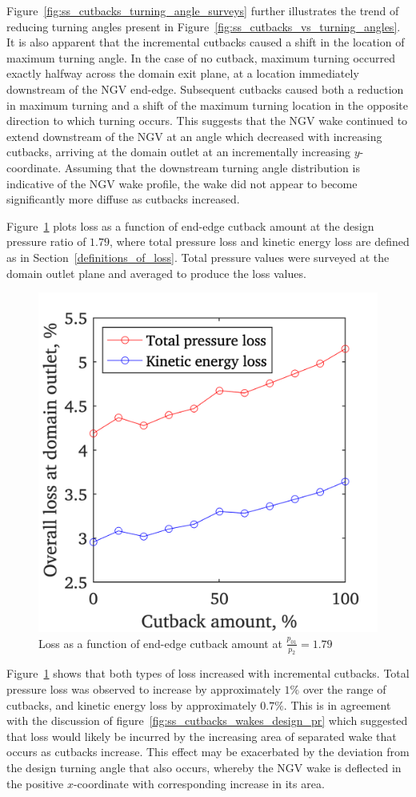 \documentclass[a4paper, 11pt, oneside]{report}
\begin{document}
Figure~\ref{fig:ss_cutbacks_turning_angle_surveys} further illustrates the trend of reducing turning angles present in Figure~\ref{fig:ss_cutbacks_vs_turning_angles}. It is also apparent that the incremental cutbacks caused a shift in the location of maximum turning angle. In the case of no cutback, maximum turning occurred exactly halfway across the domain exit plane, at a location immediately downstream of the NGV end-edge. Subsequent cutbacks caused both a reduction in maximum turning and a shift of the maximum turning location in the opposite direction to which turning occurs. This suggests that the NGV wake continued to extend downstream of the NGV at an angle which decreased with increasing cutbacks, arriving at the domain outlet at an incrementally increasing $y$-coordinate. Assuming that the downstream turning angle distribution is indicative of the NGV wake profile, the wake did not appear to become significantly more diffuse as cutbacks increased.

Figure~\ref{fig:ss_cutbacks_vs_losses} plots loss as a function of end-edge cutback amount at the design pressure ratio of $1.79$, where total pressure loss and kinetic energy loss are defined as in Section~\ref{definitions_of_loss}. Total pressure values were surveyed at the domain outlet plane and averaged to produce the loss values.

\begin{figure}[H]
	\centering
	\includegraphics[width=.45\textwidth]{figs/ss_cutbacks_vs_losses.png}
	\caption{Loss as a function of end-edge cutback amount at $\frac{p_{01}}{p_2}=1.79$}
    \label{fig:ss_cutbacks_vs_losses}
\end{figure}

Figure~\ref{fig:ss_cutbacks_vs_losses} shows that both types of loss increased with incremental cutbacks. Total pressure loss was observed to increase by approximately $1\%$ over the range of cutbacks, and kinetic energy loss by approximately $0.7\%$. This is in agreement with the discussion of figure~\ref{fig:ss_cutbacks_wakes_design_pr} which suggested that loss would likely be incurred by the increasing area of separated wake that occurs as cutbacks increase. This effect may be exacerbated by the deviation from the design turning angle that also occurs, whereby the NGV wake is deflected in the positive $x$-coordinate with corresponding increase in its area.
\end{document}
